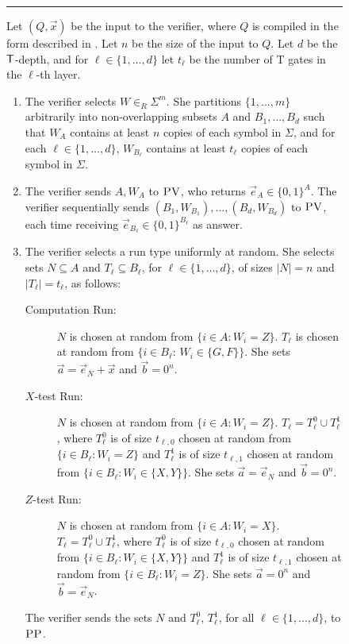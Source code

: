 \documentclass{toc}
\newcommand{\pv}{\textsc{PV}}
\newcommand{\pp}{\textsc{PP}}
\begin{document}
\begin{figure}[H]
\rule{\textwidth}{0.5pt}
\vspace{-0.5cm}   %
\justify 
Let $(Q,\vec{x})$ be the input to the verifier, where $Q$ is compiled in the form described in . Let $n$ be the size of the input to $Q$. Let $d$ be the $\sf T$-depth, and for $\ell\in\{1,\ldots,d\}$ let $t_\ell$ be the number of {\sf T} gates in the $\ell$-th layer. 
\begin{enumerate}
\itemsep=-2.5pt   %
\item The verifier selects $W \in_R\Sigma^{m}$. She partitions $\{1,\ldots,m\}$ arbitrarily into non-overlapping subsets $A$ and $B_1,\ldots,B_d$ such that $W_A$ contains at least $n$ copies of each symbol in $\Sigma$, and for each $\ell\in\{1,\ldots,d\}$, $W_{B_\ell}$ contains at least $t_\ell$ copies of each symbol in $\Sigma$.
\item The verifier sends $A,W_A$ to $\pv$, who returns $\vec{e}_A \in \{0,1\}^A$. The verifier sequentially sends  $(B_1,W_{B_1}),\ldots,(B_d,W_{B_d})$ to $\pv$, each time receiving $\vec{e}_{B_\ell}\in \{0,1\}^{B_\ell}$ as answer. 
\item The verifier selects a run type uniformly at random. She selects sets $N \subseteq A$ and  $T_\ell \subseteq B_\ell$, for $\ell\in\{1,\ldots,d\}$, of sizes $|N|=n$ and $|T_\ell|=t_\ell$, as follows:
\begin{description}
\item[Computation Run:] $N$ is chosen at random from 
$\{i\in A: W_i=Z\}$. $T_\ell$ is chosen at random from $\{i\in B_\ell:\,W_i\in \{G,F\}\}$. 
She sets $\vec{a} = \vec{e}_N + \vec{x}$ and $\vec{b} = 0^n$.
\item[$X$-test Run:] $N$ is chosen at random from 
$\{i\in A:W_i=Z\}$. $T_\ell = T_\ell^0 \cup T_\ell^1$, where $T_\ell^0$ is of size $t_{\ell,0}$ chosen at random from $\{i\in B_\ell:W_i=Z\}$ and $T_\ell^1$ is of size $t_{\ell,1}$ chosen at random from $\{i\in B_\ell:W_i\in \{X,Y\}\}$.
She sets $\vec{a} = \vec{e}_N$ and $\vec{b} = 0^n$.
\item[$Z$-test Run:] $N$ is chosen at random from 
$\{i\in A:W_i=X\}$. $T_\ell = T_\ell^0 \cup T_\ell^1$, where $T_\ell^0$ is of size $t_{\ell,0}$ chosen at random from $\{i\in B_\ell:W_i\in\{X,Y\}\}$ and $T_\ell^1$ is of size $t_{\ell,1}$ chosen at random from $\{i\in B_\ell:W_i=Z\}$.
She sets $\vec{a} = 0^n$ and $\vec{b} = \vec{e}_N$.
\end{description}
The verifier sends the sets $N$ and $T_\ell^0$, $T_\ell^1$, for all $\ell\in\{1,\ldots,d\}$, to $\pp$.

\end{enumerate}
\end{figure}
\end{document}
